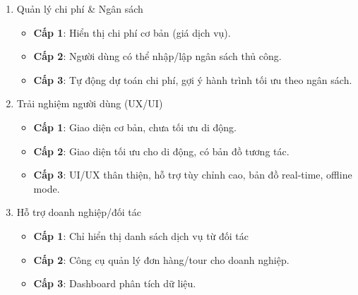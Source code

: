 \begin{enumerate}
\begin{itemize}
            \item \textbf{Cấp 3}: Diễn đàn/cộng đồng, xác thực chống review ảo, gợi ý dựa trên cộng đồng.
        \end{itemize}
    \item Quản lý chi phí \& Ngân sách
        \begin{itemize}
            \item \textbf{Cấp 1}: Hiển thị chi phí cơ bản (giá dịch vụ).
            \item \textbf{Cấp 2}: Người dùng có thể nhập/lập ngân sách thủ công.
            \item \textbf{Cấp 3}: Tự động dự toán chi phí, gợi ý hành trình tối ưu theo ngân sách.
        \end{itemize}
    \item Trải nghiệm người dùng (UX/UI)
        \begin{itemize}
            \item \textbf{Cấp 1}: Giao diện cơ bản, chưa tối ưu di động.
            \item \textbf{Cấp 2}: Giao diện tối ưu cho di động, có bản đồ tương tác.
            \item \textbf{Cấp 3}: UI/UX thân thiện, hỗ trợ tùy chỉnh cao, bản đồ real-time, offline mode.
        \end{itemize}
    \item Hỗ trợ doanh nghiệp/đối tác
        \begin{itemize}
            \item \textbf{Cấp 1}: Chỉ hiển thị danh sách dịch vụ từ đối tác
            \item \textbf{Cấp 2}: Công cụ quản lý đơn hàng/tour cho doanh nghiệp.
            \item \textbf{Cấp 3}: Dashboard phân tích dữ liệu.
        \end{itemize}
\end{enumerate}

